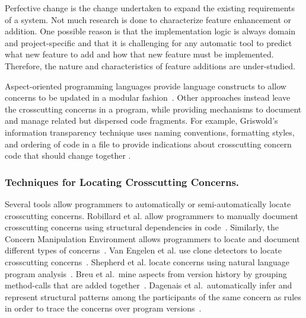 Perfective change is the change undertaken to expand the existing requirements of a system. Not much research is done to characterize feature enhancement or addition. One possible reason is that the implementation logic is always domain and project-specific and that it is challenging for any automatic tool to predict what new feature to add and how that new feature must be implemented. Therefore, the nature and characteristics of feature additions are under-studied. 

  
Aspect-oriented programming languages provide language constructs to allow concerns to be updated in a modular fashion~\cite{Kiczales2001:OA}. Other approaches instead leave the crosscutting concerns in a program, while providing mechanisms to document and manage related but dispersed code fragments. For example, Griswold's information transparency technique uses naming conventions, formatting styles, and ordering of code in a file to provide indications about crosscutting concern code that should change together \cite{Griswold2001}. 

\subsubsection{Techniques for Locating Crosscutting Concerns.}
Several tools allow programmers to automatically or semi-automatically locate crosscutting concerns. Robillard et al. allow programmers to manually document crosscutting concerns using structural dependencies in code~\cite{Robillard2003}. Similarly, the Concern Manipulation Environment allows programmers to locate and document different types of concerns~\cite{Harrison2005}. Van Engelen et al. use clone detectors to locate crosscutting concerns~\cite{VanEngelen2005}. Shepherd et al. locate concerns using natural language program analysis~\cite{Shepherd2007}. Breu et al.~mine aspects from version history by grouping method-calls that are added together~\cite{Breu2006}. Dagenais et al.~automatically infer and represent structural patterns among the participants of the same concern as rules in order to trace the concerns over program versions~\cite{Dagenais2007}. 

